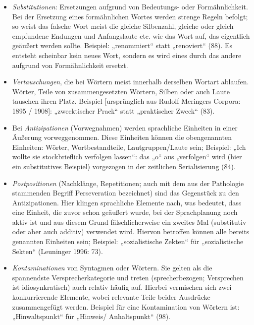 \documentclass[
  letterpaper,
]{scrbook}
\begin{document}
\begin{itemize}
\item
  \emph{Substitutionen}: Ersetzungen aufgrund von Bedeutungs- oder
  Formähnlichkeit. Bei der Ersetzung eines formähnlichen Wortes werden
  strenge Regeln befolgt; so weist das falsche Wort meist die gleiche
  Silbenzahl, gleiche oder gleich empfundene Endungen und Anfangslaute
  etc. wie das Wort auf, das eigentlich geäußert werden sollte.
  Beispiel: „renommiert`` statt „renoviert`` (88). Es entsteht scheinbar
  kein neues Wort, sondern es wird eines durch das andere aufgrund von
  Formähnlichkeit ersetzt.
\item
  \emph{Vertauschungen}, die bei Wörtern meist innerhalb derselben
  Wortart ablaufen. Wörter, Teile von zusammengesetzten Wörtern, Silben
  oder auch Laute tauschen ihren Platz. Beispiel {[}ursprünglich aus
  Rudolf Meringers Corpora: 1895 / 1908{]}: „zwecktischer Prack`` statt
  „praktischer Zweck`` (83).
\item
  Bei \emph{Antizipationen} (Vorwegnahmen) werden sprachliche Einheiten
  in einer Äußerung vorweggenommen. Diese Einheiten können die
  obengenannten Einheiten: Wörter, Wortbestandteile, Lautgruppen/Laute
  sein; Beispiel: „Ich wollte sie stockbrieflich verfolgen lassen``: das
  „o`` aus „verfolgen`` wird (hier ein substitutives Beispiel)
  vorgezogen in der zeitlichen Serialisierung (84).
\item
  \emph{Postpositionen} (Nachklänge, Repetitionen; auch mit dem aus der
  Pathologie stammenden Begriff Perseveration bezeichnet) sind das
  Gegenstück zu den Antizipationen. Hier klingen sprachliche Elemente
  nach, was bedeutet, dass eine Einheit, die zuvor schon geäußert wurde,
  bei der Sprachplanung noch aktiv ist und aus diesem Grund
  fälschlicherweise ein zweites Mal (substitutiv oder aber auch additiv)
  verwendet wird. Hiervon betroffen können alle bereits genannten
  Einheiten sein; Beispiel: „sozialistische Zekten`` für „sozialistische
  Sekten`` (Leuninger 1996: 73).
\item
  \emph{Kontaminationen} von Syntagmen oder Wörtern. Sie gelten als die
  spannendste Versprecherkategorie und treten (sprecherbezogen;
  Versprechen ist idiosynkratisch) auch relativ häufig auf. Hierbei
  vermischen sich zwei konkurrierende Elemente, wobei relevante Teile
  beider Ausdrücke zusammengefügt werden. Beispiel für eine
  Kontamination von Wörtern ist: „Hinwaltspunkt`` für „Hinweis/
  Anhaltspunkt`` (98).
\end{itemize}
\end{document}
